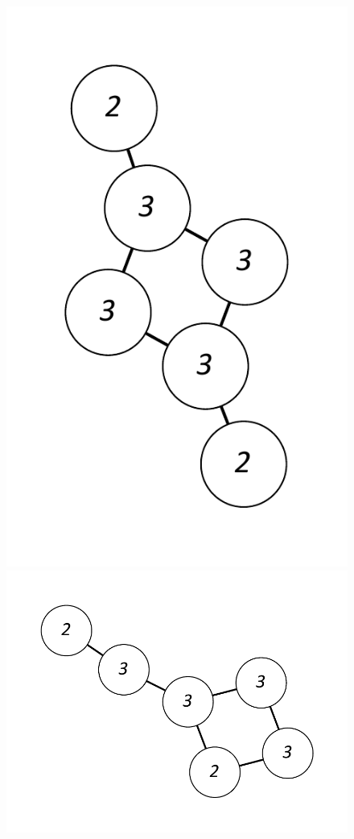 \documentclass[12pt]{article}
\theoremstyle{plain}
\theoremstyle{definition}
\theoremstyle{remark}
\begin{document}
\begin{figure}[htb]
		\includegraphics[scale=0.25]{Delta3TriangleFree/000110011010010[3,3,2,2,3,3].pdf}
     	\includegraphics[scale=0.25]{Delta3TriangleFree/001010011011000[3,3,2,2,3,3].pdf}

\end{figure}
\end{document}

